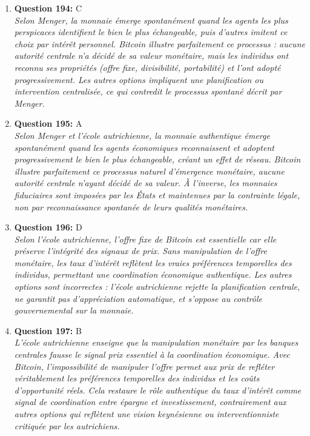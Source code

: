 \documentclass[12pt,a4paper]{article}
\begin{document}
\begin{enumerate}
\item \textbf{Question 194:} C
\\ \textit{Selon Menger, la monnaie émerge spontanément quand les agents les plus perspicaces identifient le bien le plus échangeable, puis d'autres imitent ce choix par intérêt personnel. Bitcoin illustre parfaitement ce processus : aucune autorité centrale n'a décidé de sa valeur monétaire, mais les individus ont reconnu ses propriétés (offre fixe, divisibilité, portabilité) et l'ont adopté progressivement. Les autres options impliquent une planification ou intervention centralisée, ce qui contredit le processus spontané décrit par Menger.}

\item \textbf{Question 195:} A
\\ \textit{Selon Menger et l'école autrichienne, la monnaie authentique émerge spontanément quand les agents économiques reconnaissent et adoptent progressivement le bien le plus échangeable, créant un effet de réseau. Bitcoin illustre parfaitement ce processus naturel d'émergence monétaire, aucune autorité centrale n'ayant décidé de sa valeur. À l'inverse, les monnaies fiduciaires sont imposées par les États et maintenues par la contrainte légale, non par reconnaissance spontanée de leurs qualités monétaires.}

\item \textbf{Question 196:} D
\\ \textit{Selon l'école autrichienne, l'offre fixe de Bitcoin est essentielle car elle préserve l'intégrité des signaux de prix. Sans manipulation de l'offre monétaire, les taux d'intérêt reflètent les vraies préférences temporelles des individus, permettant une coordination économique authentique. Les autres options sont incorrectes : l'école autrichienne rejette la planification centrale, ne garantit pas d'appréciation automatique, et s'oppose au contrôle gouvernemental sur la monnaie.}

\item \textbf{Question 197:} B
\\ \textit{L'école autrichienne enseigne que la manipulation monétaire par les banques centrales fausse le signal prix essentiel à la coordination économique. Avec Bitcoin, l'impossibilité de manipuler l'offre permet aux prix de refléter véritablement les préférences temporelles des individus et les coûts d'opportunité réels. Cela restaure le rôle authentique du taux d'intérêt comme signal de coordination entre épargne et investissement, contrairement aux autres options qui reflètent une vision keynésienne ou interventionniste critiquée par les autrichiens.}


\end{enumerate}
\end{document}
